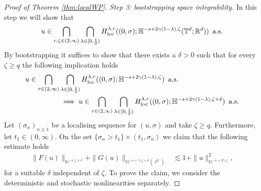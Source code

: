 \documentclass[11pt, a4paper,oneside, reqno]{amsart}
\theoremstyle{remark} %
\theoremstyle{definition} %
\numberwithin{theorem}{section}
\numberwithin{equation}{section}
\newcommand{\T}{\mathbb{T}}
\newcommand{\Hs}{\mathbb{H}}
\newcommand{\RR}{\mathbb{R}}
\newcommand{\half}{\frac{1}{2}}
\newcommand{\RRd}{\RR^d}
\newcommand{\gam}{\gamma}
\newcommand{\loc}{{\rm loc}}
\begin{document}
\begin{proof}[Proof of Theorem \ref{thm:localWP}]
\textit{Step 3: bootstrapping space integrability.} In this step we will show that 
\begin{equation}\label{eq:resultStep3}
    u\in \bigcap_{r,\zeta\in(2,\infty)}\bigcap_{\lambda\in[0,\half)}H^{\lambda, r}_\loc
((0,\sigma); \Hs^{-s+2\gam(1-\lambda),\zeta}(\T^d;\RRd))\, \text{ a.s.}
\end{equation}
By bootstrapping it suffices to show that there exists a $\delta>0$ such that for every $\zeta\geq q$ the following implication holds
\begin{equation}\label{eq:bootstrap_space_int}
\begin{aligned}
        u\in \bigcap_{r\in(2,\infty)}&\bigcap_{\lambda\in[0,\half)}H^{\lambda, r}_\loc
((0,\sigma); \Hs^{-s+2\gam(1-\lambda),\zeta}) \,\text{ a.s. }\\
&\implies u\in \bigcap_{r\in(2,\infty)}\bigcap_{\lambda\in[0,\half)}H^{\lambda, r}_\loc
((0,\sigma); \Hs^{-s+2\gam(1-\lambda),\zeta+\delta})\,\text{ a.s.}
\end{aligned}
\end{equation}
Let $(\sigma_n)_{n\geq1}$ be a localising sequence for $(u,\sigma)$ and take $\zeta\geq q$. Furthermore, let $t_1\in(0,\infty)$. On the set $\{\sigma_n>t_1\}\times (t_1, \sigma_n)$ we claim that the following estimate holds
\begin{align}\label{eq:claim_estFG}
    \|F(u)\|_{\Hs^{-s,\zeta+\delta}}+ \|G(u)\|_{\Hs^{-s+\gam, \zeta+\delta}(\ell^2)}&\lesssim 1+ \|u\|^2_{\Hs^{-s+2\gam,\zeta}},
\end{align}
for a suitable $\delta$ independent of $\zeta$. To prove the claim, we consider the deterministic and stochastic nonlinearities separately.


\end{proof}
\end{document}
